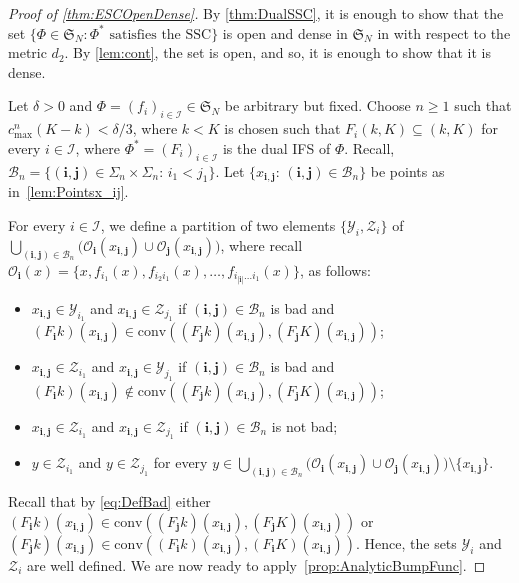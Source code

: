 \documentclass[12pt,]{article}
\def\cref#1{\ref{#1}}%
\theoremstyle{definition}
\theoremstyle{remark}
\newcommand{\0}{\mathbf{0}}
\newcommand{\bi}{\mathbf{i}}
\newcommand{\bj}{\mathbf{j}}
\begin{document}
\begin{proof}[Proof of \cref{thm:ESCOpenDense}] 
By \cref{thm:DualSSC}, it is enough to show that the set $\{\Phi\in\mathfrak{S}_N:\Phi^*\text{ satisfies the SSC}\}$ is open and dense in $\mathfrak{S}_N$ in with respect to the metric $d_2$. By \cref{lem:cont}, the set is open, and so, it is enough to show that it is dense.

Let $\delta>0$ and $\Phi=(f_i)_{i\in\mathcal{I}}\in\mathfrak{S}_N$ be arbitrary but fixed. Choose $n\geq 1$ such that $c_{\max}^n(K-k)<\delta/3$, where $k<K$ is chosen such that $F_i(k,K)\subseteq(k,K)$ for every $i\in\mathcal{I}$, where $\Phi^*=(F_i)_{i\in\mathcal{I}}$ is the dual IFS of $\Phi$. Recall,
$\mathcal{B}_n=\{(\bi,\bj)\in\Sigma_n\times\Sigma_n:\, i_1<j_1\}$. Let 
$\{x_{\bi,\bj}:\, (\bi,\bj)\in\mathcal{B}_n\}$ be points as in~\cref{lem:Pointsx_ij}. 

For every $i\in\mathcal{I}$, we define a partition of two elements $\{\mathcal{Y}_i, \mathcal{Z}_i\}$ of $\bigcup_{(\bi,\bj)\in\mathcal{B}_n} \big(\mathcal{O}_{\bi}(x_{\bi,\bj})\cup
\mathcal{O}_{\bj}(x_{\bi,\bj})\big)$, where recall $\mathcal{O}_{\bi}(x)= \{x,f_{i_1}(x), f_{i_2i_1}(x),\ldots,f_{i_{|\bi|}\ldots
	i_1}(x)\}$, as follows:
\begin{itemize}
	\item $x_{\bi,\bj}\in\mathcal{Y}_{i_1}$ and $x_{\bi,\bj}\in\mathcal{Z}_{j_1}$ if $(\bi,\bj)\in\mathcal{B}_n$ is bad and  $(F_{\bi}k)(x_{\bi,\bj})\in\mathrm{conv}\left((F_{\bj}k)(x_{\bi,\bj}),(F_{\bj}K)(x_{\bi,\bj})\right)$;
	\item $x_{\bi,\bj}\in\mathcal{Z}_{i_1}$ and $x_{\bi,\bj}\in\mathcal{Y}_{j_1}$ if $(\bi,\bj)\in\mathcal{B}_n$ is bad and  $(F_{\bi}k)(x_{\bi,\bj})\notin\mathrm{conv}\left((F_{\bj}k)(x_{\bi,\bj}),(F_{\bj}K)(x_{\bi,\bj})\right)$;
	\item $x_{\bi,\bj}\in\mathcal{Z}_{i_1}$ and $x_{\bi,\bj}\in\mathcal{Z}_{j_1}$ if $(\bi,\bj)\in\mathcal{B}_n$ is not bad;
	\item $y\in\mathcal{Z}_{i_1}$ and $y\in\mathcal{Z}_{j_1}$ for every $y\in\bigcup_{(\bi,\bj)\in\mathcal{B}_n} \big(\mathcal{O}_{\bi}(x_{\bi,\bj})\cup
	\mathcal{O}_{\bj}(x_{\bi,\bj})\big)\setminus\{x_{\bi,\bj}\}$.
\end{itemize}
Recall that by \cref{eq:DefBad} either $(F_{\bi}k)(x_{\bi,\bj})\in\mathrm{conv}\left((F_{\bj}k)(x_{\bi,\bj}),(F_{\bj}K)(x_{\bi,\bj})\right)$ or 
$(F_{\bj}k)(x_{\bi,\bj})\in\mathrm{conv}\left((F_{\bi}k)(x_{\bi,\bj}),(F_{\bi}K)(x_{\bi,\bj})\right)$. Hence, the sets $\mathcal{Y}_i$ and $\mathcal{Z}_i$ are well defined. We are now ready to apply~\cref{prop:AnalyticBumpFunc}.


\end{proof}
\end{document}
